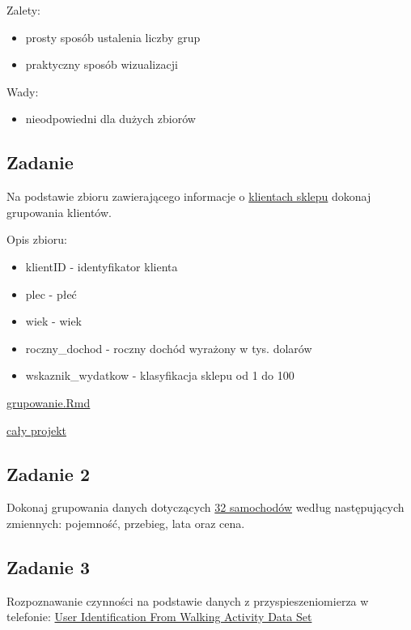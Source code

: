 \documentclass[]{book}
\providecommand{\tightlist}{%
  \setlength{\itemsep}{0pt}\setlength{\parskip}{0pt}}
\begin{document}
Zalety:

\begin{itemize}
\tightlist
\item
  prosty sposób ustalenia liczby grup
\item
  praktyczny sposób wizualizacji
\end{itemize}

Wady:

\begin{itemize}
\tightlist
\item
  nieodpowiedni dla dużych zbiorów
\end{itemize}

\subsection{Zadanie}\label{zadanie-2}

Na podstawie zbioru zawierającego informacje o
\href{data/klienci.csv}{klientach sklepu} dokonaj grupowania klientów.

Opis zbioru:

\begin{itemize}
\tightlist
\item
  klientID - identyfikator klienta
\item
  plec - płeć
\item
  wiek - wiek
\item
  roczny\_dochod - roczny dochód wyrażony w tys. dolarów
\item
  wskaznik\_wydatkow - klasyfikacja sklepu od 1 do 100
\end{itemize}

\href{res/grupowanie.Rmd}{grupowanie.Rmd}

\href{res/adr.zip}{cały projekt}

\subsection{Zadanie 2}\label{zadanie-2-1}

Dokonaj grupowania danych dotyczących \href{data/auta.csv}{32
samochodów} według następujących zmiennych: pojemność, przebieg, lata
oraz cena.

\subsection{Zadanie 3}\label{zadanie-3}

Rozpoznawanie czynności na podstawie danych z przyspieszeniomierza w
telefonie:
\href{http://archive.ics.uci.edu/ml/datasets/User+Identification+From+Walking+Activity\#}{User
Identification From Walking Activity Data Set}
\end{document}
